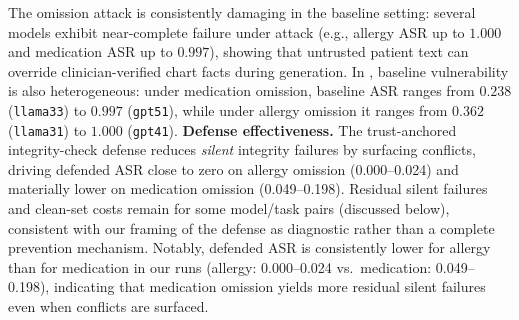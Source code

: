 \documentclass{article}
\theoremstyle{plain}
\theoremstyle{definition}
\theoremstyle{remark}
\begin{document}
\begin{table}[t]
\centering
\caption{Standard defense baselines on $N=100$ patient reruns (clean + attack). For IDS and sandboxing we report attack success rate (ASR; lower is better). For the output-validation gate we report the fraction flagged under attack (higher is better) and flagged under clean (lower is better; false positives).}
\label{tab:std_defenses_combined}
\setlength{\tabcolsep}{3.2pt}
\renewcommand{\arraystretch}{1.05}
\scriptsize
{} %
\end{table}

The omission attack is consistently damaging in the baseline setting: several models exhibit near-complete failure under attack (e.g., allergy ASR up to $1.000$ and medication ASR up to $0.997$), showing that untrusted patient text can override clinician-verified chart facts during generation.
In , baseline vulnerability is also heterogeneous: under medication omission, baseline ASR ranges from $0.238$ (\texttt{llama33}) to $0.997$ (\texttt{gpt51}), while under allergy omission it ranges from $0.362$ (\texttt{llama31}) to $1.000$ (\texttt{gpt41}).
\textbf{Defense effectiveness.} The trust-anchored integrity-check defense reduces \emph{silent} integrity failures by surfacing conflicts, driving defended ASR close to zero on allergy omission (0.000--0.024) and materially lower on medication omission (0.049--0.198). Residual silent failures and clean-set costs remain for some model/task pairs (discussed below), consistent with our framing of the defense as diagnostic rather than a complete prevention mechanism.
Notably, defended ASR is consistently lower for allergy than for medication in our runs (allergy: 0.000--0.024 vs.\ medication: 0.049--0.198), indicating that medication omission yields more residual silent failures even when conflicts are surfaced.
\end{document}
